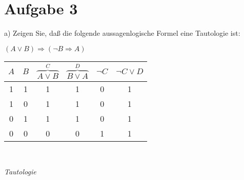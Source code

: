 \section*{Aufgabe 3}

a) Zeigen Sie, daß die folgende aussagenlogische Formel eine Tautologie ist:

$(A \lor B) \Rightarrow (\lnot B \Rightarrow A)$

\begin{table}[h]
\centering
\begin{tabular}{c|c|c|c|c|c}
$A$ & $B$ & $\overbrace{A \lor B}^{C}$ & $\overbrace{B \lor A}^{D}$ & $\lnot C$ & $\lnot C \lor D$\\
\hline
1 & 1 & 1 & 1 & 0 & 1\\
1 & 0 & 1 & 1 & 0 & 1\\
0 & 1 & 1 & 1 & 0 & 1\\
0 & 0 & 0 & 0 & 1 & 1\\
\end{tabular}
\end{table}\

\textit{Tautologie}
